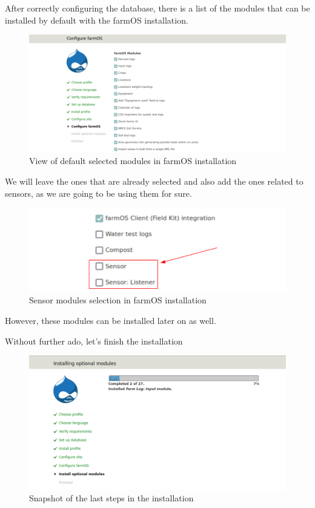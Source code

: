 \vspace{7mm}
After correctly configuring the database, there is a list of the modules that can be installed by default with the farmOS installation.

\begin{figure}[H]
    \centering
    \includegraphics[width=1\textwidth]{fig/drupal-install/farmos-modules.png}
    \caption{View of default selected modules in farmOS installation}
    \label{fig:farmos-modules}
\end{figure}

We will leave the ones that are already selected and also add the ones related to sensors, as we are going to be using them for sure.

\begin{figure}[H]
    \centering
    \includegraphics[width=1\textwidth]{fig/drupal-install/sensor-modules.png}
    \caption{Sensor modules selection in farmOS installation}
    \label{fig:sensor-modules}
\end{figure}

However, these modules can be installed later on as well.

Without further ado, let's finish the installation

\begin{figure}[H]
    \centering
    \includegraphics[width=1\textwidth]{fig/drupal-install/completing-install.png}
    \caption{Snapshot of the last steps in the installation}
    \label{fig:completing-install}
\end{figure}


